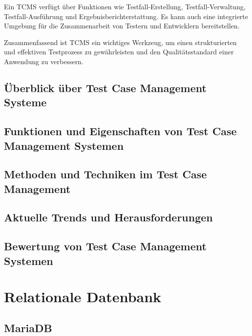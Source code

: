 \documentclass[a4paper, fontsize=11pt, parskip=half, twoside]{scrreprt}
\begin{document}
	Ein \ac{TCMS} verfügt über Funktionen wie Testfall-Erstellung, Testfall-Verwaltung, Testfall-Ausführung und Ergebnisberichterstattung. 
	Es kann auch eine integrierte Umgebung für die Zusammenarbeit von Testern und Entwicklern bereitstellen.
	
	Zusammenfassend ist \ac{TCMS} ein wichtiges Werkzeug, um einen strukturierten und effektiven Testprozess zu gewährleisten und den Qualitätsstandard einer Anwendung zu verbessern.
	
	\subsection{Überblick über Test Case Management Systeme}
	
	\subsection{Funktionen und Eigenschaften von Test Case Management Systemen}
	
	\subsection{Methoden und Techniken im Test Case Management}
	
	\subsection{Aktuelle Trends und Herausforderungen}
	
	\subsection{Bewertung von Test Case Management Systemen}
	
	\section{Relationale Datenbank}
	
	\subsection{MariaDB}
	
\end{document}

